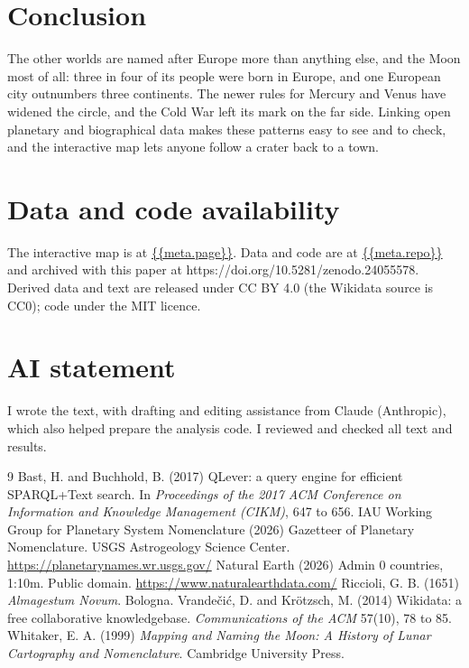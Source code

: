 \documentclass[11pt,a4paper]{article}
\begin{document}
\section{Conclusion}
The other worlds are named after Europe more than anything else, and the Moon most of all: three in four of its people were born in Europe, and one European city outnumbers three continents. The newer rules for Mercury and Venus have widened the circle, and the Cold War left its mark on the far side. Linking open planetary and biographical data makes these patterns easy to see and to check, and the interactive map lets anyone follow a crater back to a town.

\section*{Data and code availability}
The interactive map is at \url{{{meta.page}}}. Data and code are at \url{{{meta.repo}}} and archived with this paper at https://doi.org/10.5281/zenodo.24055578. Derived data and text are released under CC BY 4.0 (the Wikidata source is CC0); code under the MIT licence.

\section*{AI statement}
I wrote the text, with drafting and editing assistance from Claude (Anthropic), which also helped prepare the analysis code. I reviewed and checked all text and results.

\begin{thebibliography}{9}
 Bast, H. and Buchhold, B. (2017) QLever: a query engine for efficient SPARQL+Text search. In \textit{Proceedings of the 2017 ACM Conference on Information and Knowledge Management (CIKM)}, 647 to 656.
 IAU Working Group for Planetary System Nomenclature (2026) Gazetteer of Planetary Nomenclature. USGS Astrogeology Science Center. \url{https://planetarynames.wr.usgs.gov/}
 Natural Earth (2026) Admin 0 countries, 1:10m. Public domain. \url{https://www.naturalearthdata.com/}
 Riccioli, G. B. (1651) \textit{Almagestum Novum}. Bologna.
 Vrande\v{c}i\'c, D. and Kr\"otzsch, M. (2014) Wikidata: a free collaborative knowledgebase. \textit{Communications of the ACM} 57(10), 78 to 85.
 Whitaker, E. A. (1999) \textit{Mapping and Naming the Moon: A History of Lunar Cartography and Nomenclature}. Cambridge University Press.
\end{thebibliography}
\end{document}

